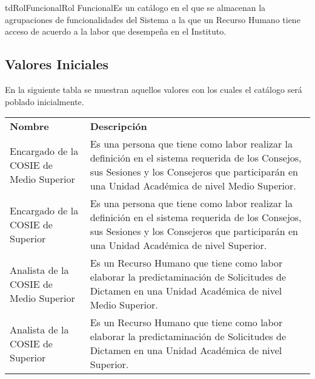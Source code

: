 	\begin{TipoDeDato}{tdRolFuncional}{Rol Funcional}{Es un catálogo en el que se almacenan la agrupaciones de funcionalidades del Sistema a la que un Recurso Humano tiene acceso de acuerdo a la labor que desempeña en el Instituto.}
		
		\begin{tdAtributos}
		
			
		\end{tdAtributos}
		
		\subsection{Valores Iniciales}
		 En la siguiente tabla se muestran aquellos valores con los cuales el catálogo será poblado  inicialmente. \cdtEmpty
		\begin{longtable}{| p{}| p{}|}
			\rowcolor{colorPrincipal}
	 		\multicolumn{2}{|c|}{\bf \color{white} Valores Iniciales}\\
	 		\hline
	 		\rowcolor{colorSecundario}
	 		\bf \color{white} Nombre & \bf \color{white}  Descripción \\
	 		\hline
	 		\endhead
			Encargado de la COSIE de Medio Superior &	Es una persona que tiene como labor realizar la definición en el sistema requerida de los Consejos, sus Sesiones y los Consejeros que participarán en una Unidad Académica de nivel Medio Superior.\\
			\hline
			Encargado de la COSIE de Superior & Es una persona que tiene como labor realizar la definición en el sistema requerida de los Consejos, sus Sesiones y los Consejeros que participarán en una Unidad Académica de nivel Superior.\\	
			\hline
			Analista de la COSIE de Medio Superior	& Es un Recurso Humano que tiene como labor elaborar la predictaminación de Solicitudes de Dictamen en una Unidad Académica de nivel Medio Superior.\\
			\hline
			Analista de la COSIE de Superior & Es un Recurso Humano que tiene como labor elaborar la predictaminación de Solicitudes de Dictamen en una Unidad Académica de nivel Superior.\\

\end{longtable}
\end{TipoDeDato}
